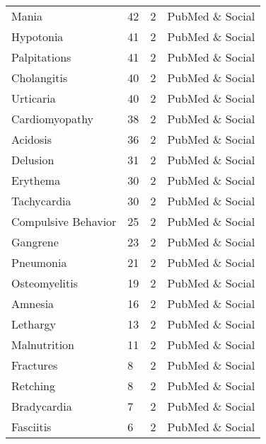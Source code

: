 \documentclass[referee,bst/sn-basic]{sn-jnl}%
\begin{document}
\begin{appendices}
\begin{longtable}{llll}
Mania                                    & 42        & 2    & PubMed \& Social        \\
Hypotonia                                & 41        & 2    & PubMed \& Social        \\
Palpitations                             & 41        & 2    & PubMed \& Social        \\
Cholangitis                              & 40        & 2    & PubMed \& Social        \\
Urticaria                                & 40        & 2    & PubMed \& Social        \\
Cardiomyopathy                           & 38        & 2    & PubMed \& Social        \\
Acidosis                                 & 36        & 2    & PubMed \& Social        \\
Delusion                                 & 31        & 2    & PubMed \& Social        \\
Erythema                                 & 30        & 2    & PubMed \& Social        \\
Tachycardia                              & 30        & 2    & PubMed \& Social        \\
Compulsive Behavior                      & 25        & 2    & PubMed \& Social        \\
Gangrene                                 & 23        & 2    & PubMed \& Social        \\
Pneumonia                                & 21        & 2    & PubMed \& Social        \\
Osteomyelitis                            & 19        & 2    & PubMed \& Social        \\
Amnesia                                  & 16        & 2    & PubMed \& Social        \\
Lethargy                                 & 13        & 2    & PubMed \& Social        \\
Malnutrition                             & 11        & 2    & PubMed \& Social        \\
Fractures                                & 8         & 2    & PubMed \& Social        \\
Retching                                 & 8         & 2    & PubMed \& Social        \\
Bradycardia                              & 7         & 2    & PubMed \& Social        \\
Fasciitis                                & 6         & 2    & PubMed \& Social        \\

\end{longtable}
\end{appendices}
\end{document}
